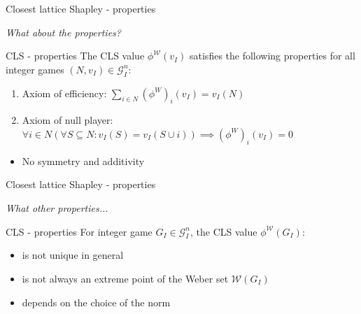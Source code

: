 \documentclass{beamer}
\begin{document}


\begin{frame}{Closest lattice Shapley - properties}

    \pause
    \textit{What about the properties?}

    \pause

    \begin{block}{CLS - properties}
        \pause
        The CLS value $\phi^\mathcal{W}(v_I)$ satisfies the following properties for all integer games $(N,v_I) \in \mathcal{G}_I^n$:
        
        \begin{enumerate}
            \pause
            \item Axiom of efficiency: $\sum_{i \in N}(\phi^W)_{i}(v_I) = v_I(N)$
            \pause
            \item Axiom of null player: $\forall i \in N(\forall S \subseteq N: v_I(S)=v_I(S \cup i)) \implies (\phi^W)_{i}(v_I) = 0$
        \end{enumerate}
    \end{block}

    \pause

    \begin{itemize}
        \item No symmetry and additivity
    \end{itemize}
\end{frame}



\begin{frame}{Closest lattice Shapley - properties}
    \pause

    \textit{What other properties...}

    \pause

    \begin{block}{CLS - properties}
        \pause
        For integer game $G_I \in \mathcal{G}_I^n$, the CLS value $\phi^\mathcal{W}(G_I)$:
        \begin{itemize}
            \pause
            \item is not unique in general
            \pause
            \item is not always an extreme point of the Weber set $\mathcal{W}(G_I)$
            \pause
            \item depends on the choice of the norm
        \end{itemize}
    \end{block}
\end{frame}
\end{document}
